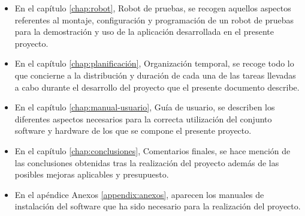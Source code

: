 \begin{itemize}
\item En el capítulo \ref{chap:robot}, Robot de pruebas, se recogen aquellos aspectos referentes al montaje, configuración y programación de un robot de pruebas para la demostración y uso de la aplicación desarrollada en el presente proyecto. 

\item En el capítulo \ref{chap:planificación}, Organización temporal, se recoge todo lo que concierne a la distribución y duración de cada una de las tareas llevadas a cabo durante el desarrollo del proyecto que el presente documento describe.

\item En el capítulo \ref{chap:manual-usuario}, Guía de usuario, se describen los diferentes aspectos necesarios para la correcta utilización del conjunto software y hardware de los que se compone el presente proyecto.

\item En el capítulo \ref{chap:conclusiones}, Comentarios finales, se hace mención de las conclusiones obtenidas tras la realización del proyecto además de las posibles mejoras aplicables y presupuesto.

\item En el apéndice Anexos \ref{appendix:anexos}, aparecen los manuales de instalación del software que ha sido necesario para la realización del proyecto.

\end{itemize}
